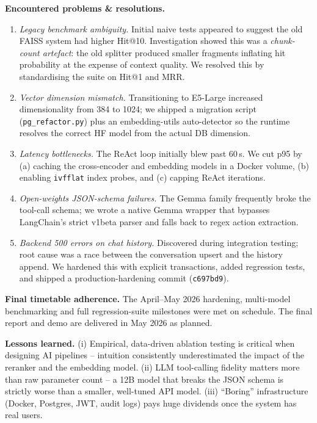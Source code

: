 \documentclass[11pt, a4paper]{article}
\begin{document}
\begin{itemize}[leftmargin=*]
\textbf{Encountered problems \& resolutions.}
\begin{enumerate}[leftmargin=*]
    \item \textit{Legacy benchmark ambiguity.} Initial naive tests appeared to suggest the old FAISS system had higher Hit@10. Investigation showed this was a \textit{chunk-count artefact}: the old splitter produced smaller fragments inflating hit probability at the expense of context quality. We resolved this by standardising the suite on Hit@1 and MRR.
    \item \textit{Vector dimension mismatch.} Transitioning to E5-Large increased dimensionality from 384 to 1024; we shipped a migration script (\texttt{pg\_refactor.py}) plus an embedding-utils auto-detector so the runtime resolves the correct HF model from the actual DB dimension.
    \item \textit{Latency bottlenecks.} The ReAct loop initially blew past 60\,s. We cut p95 by (a) caching the cross-encoder and embedding models in a Docker volume, (b) enabling \texttt{ivfflat} index probes, and (c) capping ReAct iterations.
    \item \textit{Open-weights JSON-schema failures.} The Gemma family frequently broke the tool-call schema; we wrote a native Gemma wrapper that bypasses LangChain's strict v1beta parser and falls back to regex action extraction.
    \item \textit{Backend 500 errors on chat history.} Discovered during integration testing; root cause was a race between the conversation upsert and the history append. We hardened this with explicit transactions, added regression tests, and shipped a production-hardening commit (\texttt{c697bd9}).
\end{enumerate}

\textbf{Final timetable adherence.} The April--May 2026 hardening, multi-model benchmarking and full regression-suite milestones were met on schedule. The final report and demo are delivered in May 2026 as planned.

\textbf{Lessons learned.} (i) Empirical, data-driven ablation testing is critical when designing AI pipelines -- intuition consistently underestimated the impact of the reranker and the embedding model. (ii) LLM tool-calling fidelity matters more than raw parameter count -- a 12B model that breaks the JSON schema is strictly worse than a smaller, well-tuned API model. (iii) ``Boring'' infrastructure (Docker, Postgres, JWT, audit logs) pays huge dividends once the system has real users.


\end{itemize}
\end{document}
